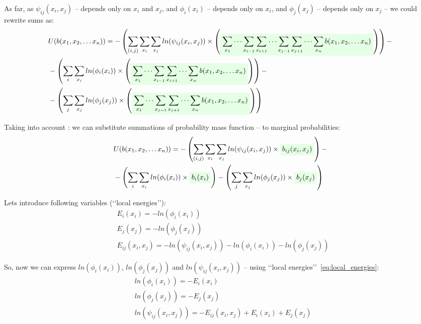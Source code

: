 \documentclass[fleqn,leqno]{article}
\newcommand{\highlight}[1]{\colorbox{green!10}{$\displaystyle#1$}}
\begin{document}
As far, as $\psi_{ij}(x_i, x_j)$ -- depends only on $x_i$ and $x_j$, and $\phi_{i}(x_i)$ -- depends only on $x_i$, and $\phi_{j}(x_j)$ -- depends only on $x_j$ -- we could rewrite sums as:
\begin{equation}
\begin{split}
   & U(b(x_1,x_2,\dots x_n)) = -\left( \sum_{(i, j)} \sum_{x_i} \sum_{x_j} ln(\psi_{ij}(x_i, x_j)) \times \left( \highlight{\sum_{x_1} \cdots \sum_{x_{i-1}} \sum_{x_{i+1}} \cdots \sum_{x_{j-1}} \sum_{x_{j+1}} \cdots \sum_{x_n}  b(x_1, x_2, \dots x_n)} \right) \right) - \\
   & -\left( \sum_{i} \sum_{x_i} ln(\phi_{i}(x_i)) \times \left( \highlight{\sum_{x_1} \cdots \sum_{x_{i-1}} \sum_{x_{i+1}} \cdots \sum_{x_n} b(x_1, x_2, \dots x_n)} \right) \right) - \\
   & -\left( \sum_{j} \sum_{x_j} ln(\phi_{j}(x_j)) \times \left( \highlight{\sum_{x_1} \cdots \sum_{x_{j-1}} \sum_{x_{j+1}} \cdots \sum_{x_n} b(x_1, x_2, \dots x_n)} \right) \right)
\end{split}
\end{equation}

Taking into account : we can substitute summations of probability mass function -- to marginal probabilities:
\begin{equation}
\begin{split}
   & U(b(x_1,x_2,\dots x_n)) = -\left( \sum_{(i, j)} \sum_{x_i} \sum_{x_j} ln(\psi_{ij}(x_i, x_j)) \times \highlight{b_{ij}(x_i, x_j)} \right) - \\
   & -\left( \sum_{i} \sum_{x_i} ln(\phi_{i}(x_i)) \times \highlight{b_i(x_i)} \right) - \left( \sum_{j} \sum_{x_j} ln(\phi_{j}(x_j)) \times \highlight{b_j(x_j)} \right)
\end{split}
\end{equation}

Lets introduce following variables (\lq \lq local energies\rq \rq):
\begin{equation} \label{eq:local_energies}
\begin{split}
& E_i(x_i)    = -ln(\phi_i(x_i)) \\
& E_j(x_j)    = -ln(\phi_j(x_j)) \\
& E_{ij}(x_i, x_j) = -ln(\psi_{ij}(x_i, x_j)) -ln(\phi_i(x_i)) -ln(\phi_j(x_j))
\end{split}
\end{equation}

So, now we can express $ln(\phi_i(x_i))$, $ln(\phi_j(x_j))$ and $ln(\psi_{ij}(x_i, x_j))$ -- using \lq \lq local energies\rq \rq\ \eqref{eq:local_energies}:
\begin{equation} \label{eq:ln_potentials_as_local_energies}
\begin{split}
& ln(\phi_i(x_i))    = -E_i(x_i) \\
& ln(\phi_j(x_j))    = -E_j(x_j) \\
& ln(\psi_{ij}(x_i, x_j)) = -E_{ij}(x_i, x_j) + E_i(x_i) + E_j(x_j)
\end{split}
\end{equation}
\end{document}
